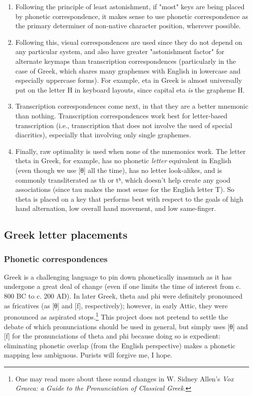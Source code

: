 \documentclass[11pt]{article}
\begin{document}
\begin{enumerate}
\item Following the principle of least astonishment, if "most" keys are being placed by phonetic correspondence, it makes sense to use phonetic correspondence as the primary determiner of non-native character position, wherever possible.
\item Following this, visual correspondences are used since they do not depend on any particular system, and also have greater "astonishment factor" for alternate keymaps than transcription correspondences (particularly in the case of Greek, which shares many graphemes with English in lowercase and especially uppercase forms). For example, eta in Greek is almost universally put on the letter H in keyboard layouts, since capital eta \emph{is} the grapheme H.
\item Transcription correspondences come next, in that they are a better mnemonic than nothing. Transcription correspondences work best for letter-based transcription (i.e., transcription that does not involve the used of special diacritics), especially that involving only single graphemes.
\item Finally, raw optimality is used when none of the mnemonics work. The letter theta in Greek, for example, has no phonetic \emph{letter} equivalent in English (even though we use [θ] all the time), has no letter look-alikes, and is commonly transliterated as th or tʰ, which doesn't help create any good associations (since tau makes the most sense for the English letter T). So theta is placed on a key that performs best with respect to the goals of high hand alternation, low overall hand movement, and low same-finger.
\end{enumerate}

\subsection{Greek letter placements}
\label{sec:orga761955}

\subsubsection{Phonetic correspondences}
\label{sec:orgb7bdee0}

Greek is a challenging language to pin down phonetically inasmuch as it has undergone a great deal of change (even if one limits the time of interest from c. 800 BC to c. 200 AD). In later Greek, theta and phi were definitely pronounced as fricatives (as [θ] and [f], respectively); however, in early Attic, they were pronounced as aspirated stops.\footnote{One may read more about these sound changes in W. Sidney Allen's \emph{Vox Graeca: a Guide to the Pronunciation of Classical Greek}.} This project does not pretend to settle the debate of which pronunciations should be used in general, but simply uses [θ] and [f] for the pronunciations of theta and phi because doing so is expedient: eliminating phonetic overlap (from the English perspective) makes a phonetic mapping less ambiguous. Purists will forgive me, I hope.
\end{document}
